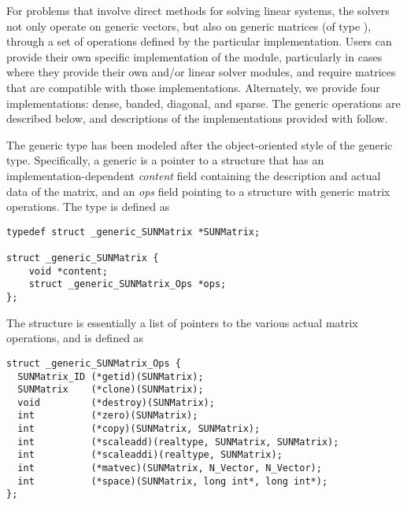 %
For problems that involve direct methods for solving linear systems,
the {\sundials} solvers not only operate on generic vectors, but also 
on generic matrices (of type ), through a set of
operations defined by the particular {\sunmatrix} implementation.
Users can provide their own specific implementation of the
{\sunmatrix} module, particularly in cases where they provide their
own {\nvector} and/or linear solver modules, and require matrices that
are compatible with those implementations.  Alternately, we provide four
{\sunmatrix} implementations: dense, banded, diagonal, and sparse.  The
generic operations are described below, and descriptions of the
implementations provided with {\sundials} follow.

The generic  type has been modeled after the
object-oriented style of the generic  type.
Specifically, a generic  is a pointer to a structure
that has an implementation-dependent {\em content} field containing
the description and actual data of the matrix, and an {\em ops} field 
pointing to a structure with generic matrix operations.
The type  is defined as
\begin{verbatim}
typedef struct _generic_SUNMatrix *SUNMatrix;

struct _generic_SUNMatrix {
    void *content;
    struct _generic_SUNMatrix_Ops *ops;
};
\end{verbatim}
The  structure is essentially a list of pointers to
the various actual matrix operations, and is defined as
\begin{verbatim}
struct _generic_SUNMatrix_Ops {
  SUNMatrix_ID (*getid)(SUNMatrix);
  SUNMatrix    (*clone)(SUNMatrix);
  void         (*destroy)(SUNMatrix);
  int          (*zero)(SUNMatrix);
  int          (*copy)(SUNMatrix, SUNMatrix);
  int          (*scaleadd)(realtype, SUNMatrix, SUNMatrix);
  int          (*scaleaddi)(realtype, SUNMatrix);
  int          (*matvec)(SUNMatrix, N_Vector, N_Vector);
  int          (*space)(SUNMatrix, long int*, long int*);
};
\end{verbatim}





